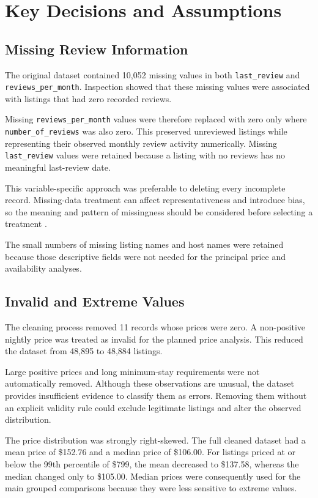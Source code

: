 \section{Key Decisions and Assumptions}

\subsection{Missing Review Information}

The original dataset contained 10,052 missing values in both
\texttt{last\_review} and \texttt{reviews\_per\_month}. Inspection showed that
these missing values were associated with listings that had zero recorded
reviews.

Missing \texttt{reviews\_per\_month} values were therefore replaced with zero
only where \texttt{number\_of\_reviews} was also zero. This preserved
unreviewed listings while representing their observed monthly review activity
numerically. Missing \texttt{last\_review} values were retained because a
listing with no reviews has no meaningful last-review date.

This variable-specific approach was preferable to deleting every incomplete
record. Missing-data treatment can affect representativeness and introduce
bias, so the meaning and pattern of missingness should be considered before
selecting a treatment \parencite{kang2013}.

The small numbers of missing listing names and host names were retained because
those descriptive fields were not needed for the principal price and
availability analyses.

\subsection{Invalid and Extreme Values}

The cleaning process removed 11 records whose prices were zero. A non-positive
nightly price was treated as invalid for the planned price analysis. This
reduced the dataset from 48,895 to 48,884 listings.

Large positive prices and long minimum-stay requirements were not automatically
removed. Although these observations are unusual, the dataset provides
insufficient evidence to classify them as errors. Removing them without an
explicit validity rule could exclude legitimate listings and alter the observed
distribution.

The price distribution was strongly right-skewed. The full cleaned dataset had
a mean price of \$152.76 and a median price of \$106.00. For listings priced at
or below the 99th percentile of \$799, the mean decreased to \$137.58, whereas
the median changed only to \$105.00. Median prices were consequently used for
the main grouped comparisons because they were less sensitive to extreme
values.

